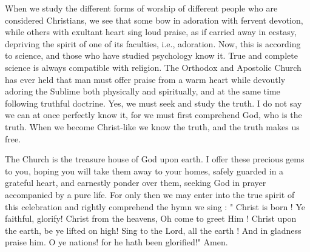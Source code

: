 When we study the different forms of worship 
of different people who are considered Christians, 
we see that some bow in adoration with fervent 
devotion, while others with exultant heart sing 
loud praise, as if carried away in ecstasy, depriving
the spirit of one of its faculties, i.e., 
adoration. Now, this is according to science, 
and those who have studied psychology know it. 
True and complete science is always compatible 
with religion. The Orthodox and Apostolic 
Church has ever held that man must offer praise 
from a warm heart while devoutly adoring the 
Sublime both physically and spiritually, and at 
the same time following truthful doctrine. Yes, 
we must seek and study the truth. I do not say 
we can at once perfectly know it, for we must 
first comprehend God, who is the truth. When 
we become Christ-like we know the truth, and 
the truth makes us free. 

The Church is the treasure house of God upon 
earth. I offer these precious gems to you, hoping 
you will take them away to your homes, safely 
guarded in a grateful heart, and earnestly ponder 
over them, seeking God in prayer accompanied 
by a pure life. For only then we may enter
into the true spirit of this celebration and rightly 
comprehend the hymn we sing : " Christ is born ! 
Ye faithful, glorify! Christ from the heavens, 
Oh come to greet Him ! Christ upon the earth, 
be ye lifted on high! Sing to the Lord, all the 
earth ! And in gladness praise him. O ye nations!
for he hath been glorified!" Amen.

